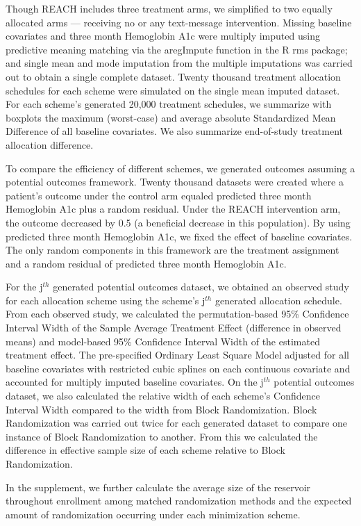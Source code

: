 \documentclass[12pt,oneside]{book}
\newlength{\li}\setlength{\li}{14.48pt}
\newlength{\di}\setlength{\di}{-3.5mm}
\theoremstyle{definition}
\theoremstyle{definition}
\theoremstyle{definition}
\theoremstyle{remark}
\begin{document}
Though REACH includes three treatment arms, we simplified to two equally
allocated arms --- receiving no or any text-message intervention.
Missing baseline covariates and three month Hemoglobin A1c were multiply
imputed using predictive meaning matching via the aregImpute function in
the R rms package; and single mean and mode imputation from the multiple
imputations was carried out to obtain a single complete dataset. Twenty
thousand treatment allocation schedules for each scheme were simulated
on the single mean imputed dataset. For each scheme's generated 20,000
treatment schedules, we summarize with boxplots the maximum (worst-case)
and average absolute Standardized Mean Difference of all baseline
covariates. We also summarize end-of-study treatment allocation
difference.

To compare the efficiency of different schemes, we generated outcomes
assuming a potential outcomes framework. Twenty thousand datasets were
created where a patient's outcome under the control arm equaled
predicted three month Hemoglobin A1c plus a random residual. Under the
REACH intervention arm, the outcome decreased by 0.5 (a beneficial
decrease in this population). By using predicted three month Hemoglobin
A1c, we fixed the effect of baseline covariates. The only random
components in this framework are the treatment assignment and a random
residual of predicted three month Hemoglobin A1c.

For the j\(^{th}\) generated potential outcomes dataset, we obtained an
observed study for each allocation scheme using the scheme's j\(^{th}\)
generated allocation schedule. From each observed study, we calculated
the permutation-based 95\% Confidence Interval Width of the Sample
Average Treatment Effect (difference in observed means) and model-based
95\% Confidence Interval Width of the estimated treatment effect. The
pre-specified Ordinary Least Square Model adjusted for all baseline
covariates with restricted cubic splines on each continuous covariate
and accounted for multiply imputed baseline covariates. On the
j\(^{th}\) potential outcomes dataset, we also calculated the relative
width of each scheme's Confidence Interval Width compared to the width
from Block Randomization. Block Randomization was carried out twice for
each generated dataset to compare one instance of Block Randomization to
another. From this we calculated the difference in effective sample size
of each scheme relative to Block Randomization.

In the supplement, we further calculate the average size of the
reservoir throughout enrollment among matched randomization methods and
the expected amount of randomization occurring under each minimization
scheme.
\end{document}
